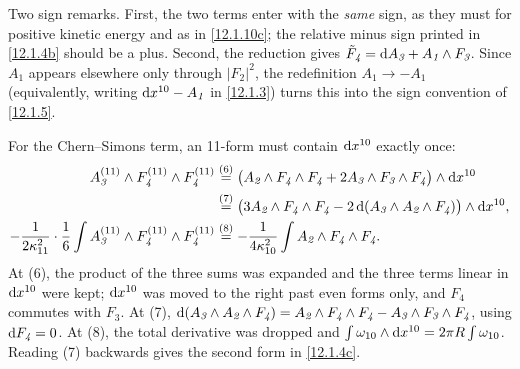 \begin{tcolorbox}[breakable]
\begin{remark}
		Two sign remarks. First, the two terms enter with the \emph{same} sign, as they must for positive kinetic energy and as in \eqref{12.1.10c}; the relative minus sign printed in \eqref{12.1.4b} should be a plus. Second, the reduction gives $\tilde F_{\textit{4}}=\mathrm{d} A_{\textit{3}}+A_{\textit{1}}\wedge F_{\textit{3}}$. Since $A_{\textit{1}}$ appears elsewhere only through $\lvert F_{\textit{2}}\rvert^{2}$, the redefinition $A_{\textit{1}}\to-A_{\textit{1}}$ (equivalently, writing $\mathrm{d} x^{10}-A_{\textit{1}}$ in \eqref{12.1.3}) turns this into the sign convention of \eqref{12.1.5}.

		For the Chern--Simons term, an 11-form must contain $\mathrm{d} x^{10}$ exactly once:
		\begin{align*}
			A^{(11)}_{\textit{3}}\wedge F^{(11)}_{\textit{4}}\wedge F^{(11)}_{\textit{4}}
			&\overset{(6)}{=} \bigl(A_{\textit{2}}\wedge F_{\textit{4}}\wedge F_{\textit{4}}+2A_{\textit{3}}\wedge F_{\textit{3}}\wedge F_{\textit{4}}\bigr)\wedge\mathrm{d} x^{10}\\
			&\overset{(7)}{=} \bigl(3A_{\textit{2}}\wedge F_{\textit{4}}\wedge F_{\textit{4}}-2\,\mathrm{d}(A_{\textit{3}}\wedge A_{\textit{2}}\wedge F_{\textit{4}})\bigr)\wedge\mathrm{d} x^{10} ,\\
			-\frac{1}{2\kappa_{11}^{2}}\cdot\frac16\int A^{(11)}_{\textit{3}}\wedge F^{(11)}_{\textit{4}}\wedge F^{(11)}_{\textit{4}}
			&\overset{(8)}{=} -\frac{1}{4\kappa_{10}^{2}}\int A_{\textit{2}}\wedge F_{\textit{4}}\wedge F_{\textit{4}} .
		\end{align*}
		At (6), the product of the three sums was expanded and the three terms linear in $\mathrm{d} x^{10}$ were kept; $\mathrm{d} x^{10}$ was moved to the right past even forms only, and $F_{\textit{4}}$ commutes with $F_{\textit{3}}$. At (7), $\mathrm{d}(A_{\textit{3}}\wedge A_{\textit{2}}\wedge F_{\textit{4}})=A_{\textit{2}}\wedge F_{\textit{4}}\wedge F_{\textit{4}}-A_{\textit{3}}\wedge F_{\textit{3}}\wedge F_{\textit{4}}$, using $\mathrm{d} F_{\textit{4}}=0$. At (8), the total derivative was dropped and $\int\omega_{10}\wedge\mathrm{d} x^{10}=2\pi R\int\omega_{10}$. Reading (7) backwards gives the second form in \eqref{12.1.4c}.
	\end{remark}
\end{tcolorbox}


